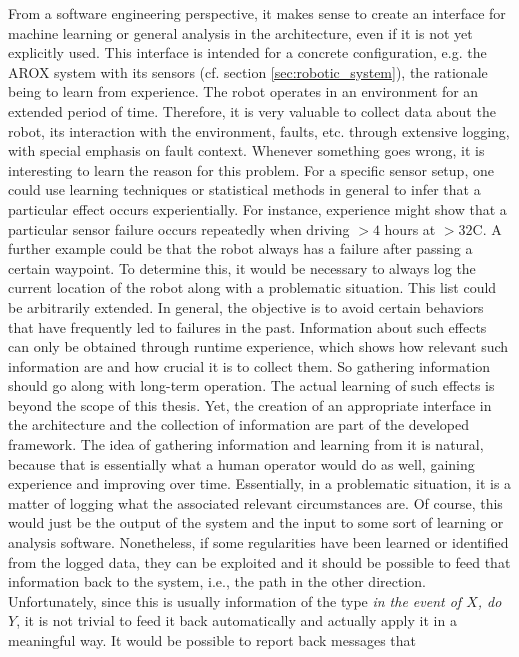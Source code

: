 \documentclass[english, master, utf8]{base/thesis_KBS}
\begin{document}
From a software engineering perspective, it makes sense to create an interface for machine learning or general analysis in the architecture, even if it is not yet explicitly used.
This interface is intended for a concrete configuration, e.g. the AROX system with its sensors (cf. section \ref{sec:robotic_system}), the rationale being to learn from experience. The robot operates in an environment for an
extended period of time. Therefore, it is very valuable to collect data about the robot, its interaction with the environment, faults, etc. through extensive logging, with special
emphasis on fault context. Whenever something goes wrong, it is interesting to learn the reason for this problem. For a specific sensor setup, one could use learning techniques or
statistical methods in general to infer that a particular effect occurs experientially. For instance, experience might show that a particular sensor failure occurs repeatedly when driving $> 4$ hours at
$> 32$\textdegree{}C. A further example could be that the robot always has a failure after passing a certain waypoint. To determine this, it would be necessary to always
log the current location of the robot along with a problematic situation. This list could be arbitrarily extended.
In general, the objective is to avoid certain behaviors that have frequently led to failures in the past. Information about such effects can only be
obtained through runtime experience, which shows how relevant such information are and how crucial it is to collect them. So gathering information should go along with long-term
operation. The actual learning of such effects is beyond the scope of this thesis. Yet, the creation of an appropriate interface in the architecture and the collection of information
are part of the developed framework. The idea of gathering information and learning from it is natural, because that is essentially what a human operator would do as well, gaining
experience and improving over time. Essentially, in a problematic situation, it is a matter of logging what the associated relevant circumstances are. Of course, this would just be
the output of the system and the input to some sort of learning or analysis software. Nonetheless, if some regularities have been learned or identified from the logged data, they can
be exploited and it should be possible to feed that information back to the system, i.e., the path in the other direction. Unfortunately, since this is usually information of the type
\textit{in the event of $X$, do $Y$}, it is not trivial to feed it back automatically and actually apply it in a meaningful way. It would be possible to report back messages that
\end{document}
